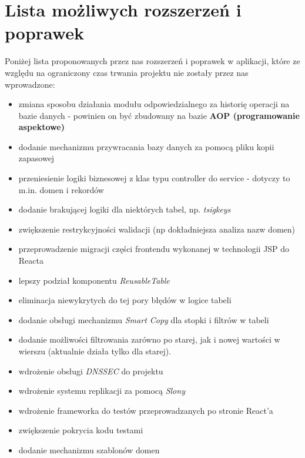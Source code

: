 \documentclass[11pt]{article}
\begin{document}
\section{Lista możliwych rozszerzeń i poprawek}
Poniżej lista proponowanych przez nas rozszerzeń i poprawek w aplikacji, które ze względu na ograniczony czas trwania projektu nie zostały przez nas wprowadzone:
\begin{itemize}
\item zmiana sposobu działania modułu odpowiedzialnego za historię operacji na bazie danych - powinien on być zbudowany na bazie \textbf{AOP (programowanie aspektowe)}
\item dodanie mechanizmu przywracania bazy danych za pomocą pliku kopii zapasowej
\item przeniesienie logiki biznesowej z klas typu controller do service - dotyczy to m.in. domen i rekordów
\item dodanie brakującej logiki dla niektórych tabel, np. \emph{tsigkeys}
\item zwiększenie restrykcyjności walidacji (np dokładniejsza analiza nazw domen)
\item przeprowadzenie migracji części frontendu wykonanej w technologii JSP do Reacta
\item lepszy podział komponentu \emph{ReusableTable}
\item eliminacja niewykrytych do tej pory błędów w logice tabeli
\item dodanie obsługi mechanizmu \emph{Smart Copy} dla stopki i filtrów w tabeli
\item dodanie możliwości filtrowania zarówno po starej, jak i nowej wartości w wierszu (aktualnie działa tylko dla starej). 
\item wdrożenie obsługi \emph{DNSSEC} do projektu
\item wdrożenie systemu replikacji za pomocą \emph{Slony}
\item wdrożenie frameworka do testów przeprowadzanych po stronie React'a
\item zwiększenie pokrycia kodu testami
\item dodanie mechanizmu szablonów domen
\end{itemize}
\end{document}

